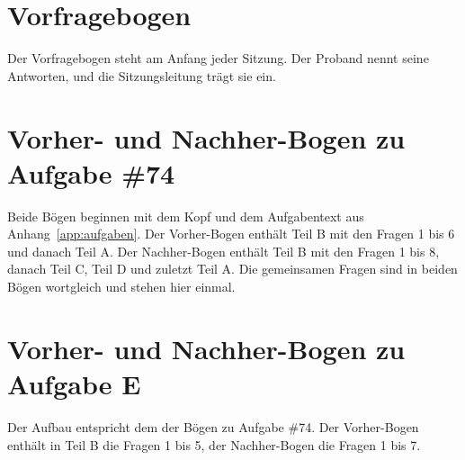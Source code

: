 \providecommand{\kreuz}{\fbox{\rule{0pt}{0.9ex}\hspace{0.9ex}}}

\section{Vorfragebogen}
\label{app:vorfragebogen}

Der Vorfragebogen steht am Anfang jeder Sitzung. Der Proband nennt seine Antworten, und die Sitzungsleitung trägt sie ein.



\section{Vorher- und Nachher-Bogen zu Aufgabe \#74}
\label{app:bogen74}

Beide Bögen beginnen mit dem Kopf und dem Aufgabentext aus Anhang~\ref{app:aufgaben}. Der Vorher-Bogen enthält Teil B mit den Fragen 1 bis 6 und danach Teil A. Der Nachher-Bogen enthält Teil B mit den Fragen 1 bis 8, danach Teil C, Teil D und zuletzt Teil A. Die gemeinsamen Fragen sind in beiden Bögen wortgleich und stehen hier einmal.



\section{Vorher- und Nachher-Bogen zu Aufgabe E}
\label{app:bogenE}

Der Aufbau entspricht dem der Bögen zu Aufgabe \#74. Der Vorher-Bogen enthält in Teil B die Fragen 1 bis 5, der Nachher-Bogen die Fragen 1 bis 7.



